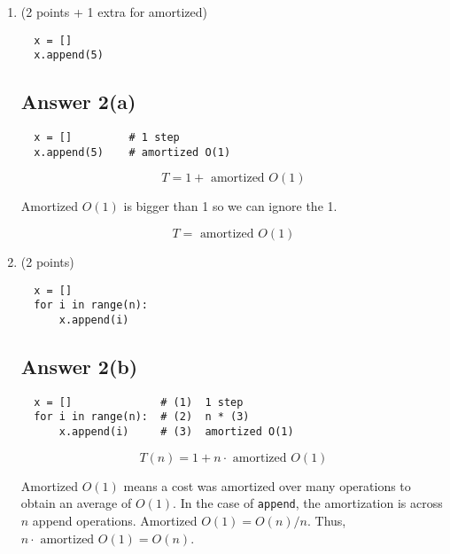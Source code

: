 \documentclass{article}
\begin{document}
\begin{enumerate}[label=(\alph*)]

\item (2 points + 1 extra for amortized)
  
\begin{verbatim}
  x = []
  x.append(5)
\end{verbatim}

\subsection*{Answer 2(a)}

\begin{verbatim}
  x = []         # 1 step
  x.append(5)    # amortized O(1)
\end{verbatim}

\begin{equation*}
  T = 1 + \text{ amortized } O(1)
\end{equation*}

Amortized $O(1)$ is bigger than 1 so we can ignore the 1.

\begin{equation*}
  \boxed{T = \text{ amortized } O(1)}
\end{equation*}


\item (2 points)

\begin{verbatim}
  x = []
  for i in range(n):
      x.append(i)
\end{verbatim}

\subsection*{Answer 2(b)}

\begin{verbatim}
  x = []              # (1)  1 step
  for i in range(n):  # (2)  n * (3) 
      x.append(i)     # (3)  amortized O(1)
\end{verbatim}

\begin{equation*}
  T(n) = 1 + n \cdot \text{ amortized } O(1) 
\end{equation*}


Amortized $O(1)$ means a cost was amortized over many operations to
obtain an average of $O(1)$.  In the case of \verb|append|, the
amortization is across $n$ append operations.  Amortized $O(1) = O(n)
/ n$.  Thus, $n \cdot \text{ amortized } O(1) = O(n)$.


\end{enumerate}
\end{document}
